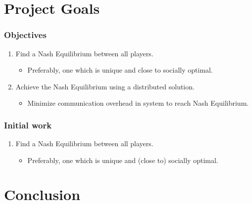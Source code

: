 \documentclass[10pt,tgadventor, onlymath]{beamer}
\begin{document}
\section{Project Goals}

\begin{frame}
\frametitle{Objectives}
\begin{enumerate}
\item Find a Nash Equilibrium between all players.
\begin{itemize}
\item Preferably, one which is unique and close to socially optimal.
\end{itemize}
\item Achieve the Nash Equilibrium using a distributed solution.
\begin{itemize}
\item Minimize communication overhead in system to reach Nash Equilibrium.
\end{itemize}
\end{enumerate}

\begin{center}
\end{center}
\end{frame}

\begin{frame}
\frametitle{Initial work}
\begin{enumerate}
\item Find a Nash Equilibrium between all players.
\begin{itemize}
\item Preferably, one which is unique and (close to) socially optimal.
\end{itemize}
\end{enumerate}
\end{frame}
%
\section{Conclusion}

\begin{frame}


\end{frame}
\end{document}
